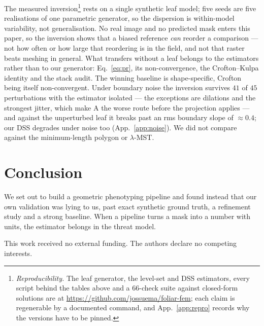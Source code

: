 \documentclass{article}
\begin{document}
The measured inversion\footnote{\emph{Reproducibility.} The leaf generator, the level-set and DSS
estimators, every script behind the tables above and a $66$-check suite against closed-form
solutions are at \url{https://github.com/jossuema/foliar-fem}; each claim is regenerable by a
documented command, and
App.~\ref{app:repro} records why the versions have to be pinned.} rests on a single synthetic leaf model; five seeds are five realisations of one parametric
generator, so the dispersion is within-model variability, not generalisation. No real image and no
predicted mask enters this paper, so the inversion shows that a biased reference \emph{can} reorder
a comparison --- not how often or how large that reordering is in the field, and not that raster
beats meshing in general. What transfers without a leaf belongs to the estimators rather than to our
generator: Eq.~\eqref{eq:pr}, its non-convergence, the Crofton--Kulpa identity and the stack audit.
The winning baseline is shape-specific, Crofton being itself non-convergent. Under boundary noise
the inversion survives $41$ of $45$ perturbations with the estimator isolated --- the exceptions
are dilations and the strongest jitter, which make A the worse route before the projection
applies --- and against the unperturbed leaf it breaks past an rms boundary slope of
$\approx 0.4$; our DSS degrades under noise too (App.~\ref{app:noise}). We did not compare against
the minimum-length polygon or $\lambda$-MST.

\section{Conclusion}

We set out to build a geometric phenotyping pipeline and found instead that our own validation was
lying to us, past exact synthetic ground truth, a refinement study and a strong baseline. When a
pipeline turns a mask into a number with units, the estimator belongs in the threat model.

\begin{ack}
This work received no external funding. The authors declare no competing interests.
\end{ack}
\end{document}
